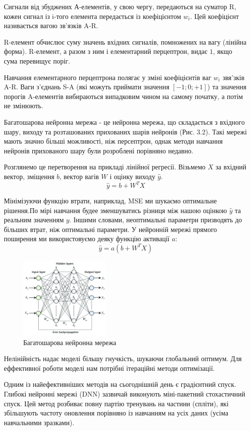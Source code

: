 Сигнали від збуджених А-елементів, у свою чергу, передаються на суматор R, кожен сигнал із i-того елемента передається із коефіцієнтом $ w_{i}$. Цей коефіцієнт називається вагою зв'язків A-R.

R-елемент обчислює суму значень вхідних сигналів, помножених на вагу (лінійна форма). R-елемент, а разом з ним і елементарний перцептрон, видає $1$, якщо сума перевищує поріг.

Навчання елементарного перцептрона полягає у зміні коефіцієнтів ваг $w_i$  звя’зків A-R. Ваги з'єднань S-A (які можуть приймати значення $[-1; 0; +1]$) та значення порогів A-елементів вибираються випадковим чином на самому початку, а потім не змінюють.

Багатошарова нейронна мережа - це нейронна мережа, що складається з вхідного шару, виходу та розташованих прихованих шарів нейронів (Рис. 3.2).
Такі мережі мають значно більші можливості, ніж персептрон, однак методи навчання нейронів прихованого шару були розроблені порівняно недавно.

Розглянемо це перетворення на прикладі лінійної регресії. Візьмемо $ X $ за вхідний вектор, зміщення $b$, вектор вагів $W$ і оцінку виходу $\hat{y}$.
\[\hat{y}=b + W^{T}X\]


Мінімізуючи функцію втрати, наприклад, MSE ми шукаємо оптимальне рішення.По мірі навчання будее зменшуватись різниця між нашою оцінкою $\hat{y}$ та реальним значенням $y$. Іншими словами, неоптимальні параметри призводять до більших втрат, ніж оптимальні параметри. У нейронній мережі прямого поширення ми використовуємо деяку функцію активації $a$:
\[\hat{y}=a(b + W^{T}X)\]
\begin{figure}
    \centering
    \includegraphics[width=0.4\textwidth]{images/MNN.png}
    \caption{Багатошарова нейронна мережа}
\end{figure}
Нелінійність надає моделі більшу гнучкість, шукаючи глобальний оптимум. Для еффективної роботи моделі нам потрібні ітераційні методи оптимізації.

Одним із найефективніших методів на сьогоднішній день є градієнтний спуск.
Глибокі нейронні мережі (DNN) зазвичай виконують міні-пакетний стохастичний спуск. Цей метод розбиває повну партію тренувань на частини (спліти), які збільшують частоту оновлення порівняно із навчанням на усіх даних (усіма навчальними зразками).

